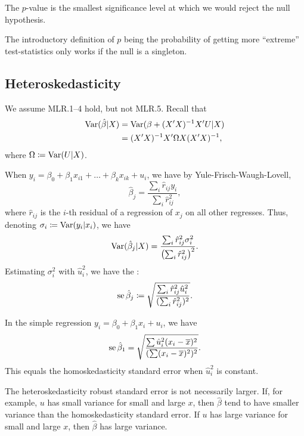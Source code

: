 \documentclass[letterpaper, 10pt]{article}
\begin{document}
\begin{definition}
  The \(p\)-value is the smallest significance level at which we would reject the null hypothesis.
\end{definition}
\begin{remark}
  The introductory definition of \(p\) being the probability of getting more ``extreme'' test-statistics only works if the null is a singleton.
\end{remark}



\subsection{Heteroskedasticity}
We assume MLR.1--4 hold, but not MLR.5.
Recall that
\begin{align*}
  \operatorname{Var}(\hat{\beta}|X)
  &= \operatorname{Var}(\beta + (X'X)^{-1} X' U|X) \\
  &= (X'X)^{-1} X' \Omega X (X'X)^{-1},
\end{align*}
where \(\Omega \coloneqq \operatorname{Var}(U|X)\). 

When \(y_i = \beta_0 + \beta_1 x_{i 1} + \dots + \beta_k x_{i k} + u_i\), we have by Yule-Frisch-Waugh-Lovell,
\[
  \hat{\beta}_j = \frac{\sum_i \hat{r}_{ij} y_i}{\sum_i \hat{r}_{ij}^2},
\]
where \(\hat{r}_{ij}\) is the \(i\)-th residual of a regression of \(x_j\) on all other regresses.
Thus, denoting \(\sigma_i \coloneqq \operatorname{Var}(y_i|x_i)\), we have
\[
  \operatorname{Var}(\hat{\beta}_j|X) = \frac{\sum_i \hat{r}_{ij}^2 \sigma_i^2}{\left( \sum_i \hat{r}_{ij}^2 \right)^2}.
\]
Estimating \(\sigma_i^2\) with \(\hat{u}_i^2\), we have the :
\[
  \operatorname{se} \hat{\beta}_j
  \coloneqq \sqrt{\frac{\sum_i \hat{r}_{ij}^2 \hat{u}_i^2}{(\sum_i \hat{r}_{ij}^2)^2}}.
\]

\begin{remark}
  In the simple regression \(y_i = \beta_0 + \beta_1 x_{i} + u_i\), we have
  \[
    \operatorname{se} \hat{\beta}_1
    = \sqrt{\frac{\sum \hat{u}_i^2 (x_i - \overline{x})^2}{(\sum (x_i - \overline{x})^2)^2}}.
  \]
  This equals the homoskedasticity standard error when \(\hat{u}_i^2\) is constant.
\end{remark}

\begin{remark}
  The heteroskedasticity robust standard error is not necessarily larger.
  If, for example, \(u\) has small variance for small and large \(x\), then \(\hat{\beta}\) tend to have smaller variance than the homoskedasticity standard error.
  If \(u\) has large variance for small and large \(x\), then \(\hat{\beta}\) has large variance.
\end{remark}
\end{document}
